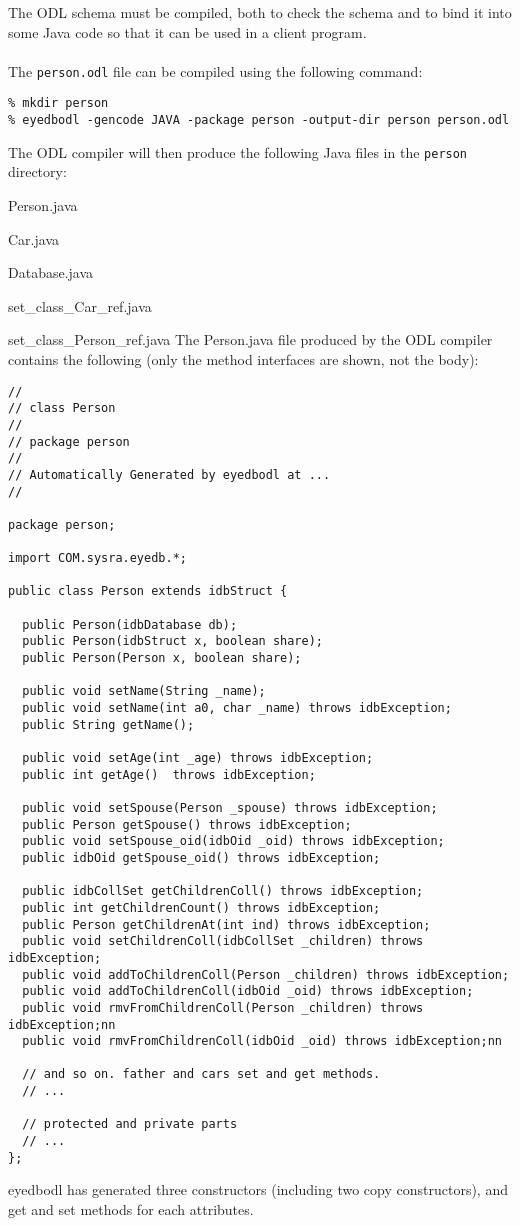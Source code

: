 The ODL schema must be compiled, both to check the schema and to bind
it into some Java code so that it can be used in a client program.
\\
\\
The \texttt{person.odl} file can be compiled using the following command:
{\verbsize \begin{verbatim}
% mkdir person
\end{verbatim}
}
The ODL compiler will then produce the following Java files in the \texttt{person} directory:
\bi
\item Person.java
\item Car.java
\item Database.java
\item set\_class\_Car\_ref.java
\item set\_class\_Person\_ref.java
\ei
The Person.java file produced by the ODL compiler contains the following
(only the method interfaces are shown, not the body):
{\verbsize \begin{verbatim}
//
// class Person
//
// package person
//
// Automatically Generated by eyedbodl at ...
//

package person;

import COM.sysra.eyedb.*;

public class Person extends idbStruct {

  public Person(idbDatabase db);
  public Person(idbStruct x, boolean share);
  public Person(Person x, boolean share);

  public void setName(String _name);
  public void setName(int a0, char _name) throws idbException;
  public String getName();

  public void setAge(int _age) throws idbException;
  public int getAge()  throws idbException;

  public void setSpouse(Person _spouse) throws idbException;
  public Person getSpouse() throws idbException;
  public void setSpouse_oid(idbOid _oid) throws idbException;
  public idbOid getSpouse_oid() throws idbException;
 
  public idbCollSet getChildrenColl() throws idbException;
  public int getChildrenCount() throws idbException;
  public Person getChildrenAt(int ind) throws idbException;
  public void setChildrenColl(idbCollSet _children) throws idbException;
  public void addToChildrenColl(Person _children) throws idbException;
  public void addToChildrenColl(idbOid _oid) throws idbException;
  public void rmvFromChildrenColl(Person _children) throws idbException;nn
  public void rmvFromChildrenColl(idbOid _oid) throws idbException;nn

  // and so on. father and cars set and get methods.
  // ...

  // protected and private parts
  // ...
};
\end{verbatim}
}
eyedbodl has generated three constructors (including two copy constructors),
and get and set methods for each attributes.

